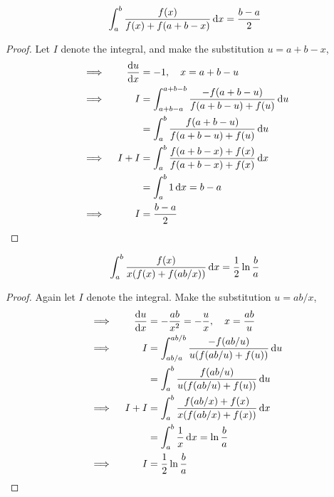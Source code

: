 \begin{theorem}
 \begin{equation*}
  \integ[a]<b>{\frac{f(x)}{f(x) + f(a + b - x)}}{x} = \frac{b - a} 2
 \end{equation*}
\end{theorem}
\begin{proof}
 Let \(I\) denote the integral, and make the substitution \(u = a + b - x\),
 \begin{alignat*}{2}
  &\implies{}& \dv<u>{x} &= -1, \quad x = a + b - u \\
  &\implies{}& I &= \integ[a + b - a]<a + b - b>{
                      \frac{-f(a + b - u)}{f(a + b - u) + f(u)}}{u} \\
  &&  &= \integ[a]<b>{\frac{f(a + b - u)}{f(a + b - u) + f(u)}}{u} \\
  &\implies{}& I + I &= \integ[a]<b>{
                      \frac{f(a + b - x) + f(x)}
                          {f(a + b - x) + f(x)}}{x} \\
  &&  &= \integ[a]<b>{1}{x} = b - a \\
  &\implies{}& I &= \frac{b - a} 2 \qedhere
 \end{alignat*}
\end{proof}
\begin{theorem}
 \begin{equation*}
  \integ[a]<b>{\frac{f(x)}{x(f(x) + f(ab / x))}}{x} = \frac 12 \ln \frac ba
 \end{equation*}
\end{theorem}
\begin{proof}
 Again let \(I\) denote the integral. Make the substitution \(u = ab / x\),
 \begin{alignat*}{2}
  &\implies{}& \dv<u>{x} &= -\frac{ab}{x^2} = -\frac ux, \quad x = \frac{ab}u \\
  &\implies{}& I &= \integ[ab/a]<ab/b>{\frac{-f(ab / u)}{u(f(ab / u) + f(u))}
  }{u} \\
  && &= \integ[a]<b>{\frac{f(ab / u)}{u(f(ab / u) + f(u))}}{u} \\
  &\implies{}& I + I &= \integ[a]<b>{\frac{f(ab / x) + f(x)}
                                  {x(f(ab / x) + f(x))}}{x} \\
  && &= \integ[a]<b>{\frac 1x}{x} = \ln \frac ba \\
  &\implies{}& I &= \frac 12 \ln \frac ba \qedhere
 \end{alignat*}
\end{proof}

